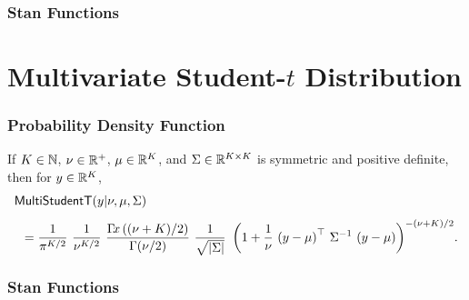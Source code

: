 
\subsubsection{Stan Functions}

\begin{description}
%
%
\end{description}



\section{Multivariate Student-$t$ Distribution}

\subsubsection{Probability Density Function}

If $K \in \nats$, $\nu \in \posreals$, $\mu \in \reals^K$, and $\Sigma
\in \reals^{K \times K}$ is symmetric and positive definite, then for
$y \in \reals^K$,
\[
\begin{array}{l}
\distro{MultiStudentT}(y|\nu,\mu,\Sigma)
\\[8pt]
\displaystyle
\hspace*{8pt}
=
\frac{1}{\pi^{K/2}}
\
\frac{1}{\nu^{K/2}}
\
\frac{\Gamma\!x\left((\nu + K)/2\right)}
     {\Gamma(\nu/2)}
\
\frac{1}{\sqrt{\left| \Sigma \right|}}
\
\left(
1 + \frac{1}{\nu} \, \left(y - \mu\right)^{\top} \, \Sigma^{-1} \, \left(y - \mu\right)
\right)^{-(\nu + K)/2}
\! .
\end{array}
\]
\vspace*{4pt}



\subsubsection{Stan Functions}

